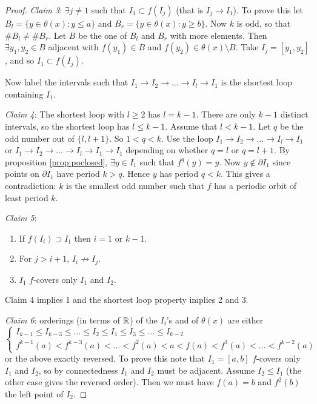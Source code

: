 \documentclass{notes}
\theoremstyle{plain}
\begin{document}
\begin{proof}
\emph{Claim 3}:  $\exists j \neq 1$ such that $I_1 \subset f(I_j)$
(that is $I_j \to I_1$).  To prove this let $B_l = \{y \in \theta(x)
: y \le a \}$ and $B_r = \{y \in \theta(x): y \ge b\}$.  Now $k$ is
odd, so that $\# B_l \neq \# B_r$.  Let $B$ be the one of $B_l$ and $B_r$
with more elements.  Then $\exists y_1, y_2 \in B$ adjacent with 
$f(y_1) \in B$ and $f(y_2) \in \theta(x) \setminus B$.  Take $I_j =
[y_1,y_2]$, and so $I_1 \subset f(I_j)$.

Now label the intervals such that $I_1 \to I_2 \to \dots \to I_l \to I_1$
is the shortest loop containing $I_1$.

\emph{Claim 4}: The shortest loop with $l \ge 2$ has $l=k-1$.  There
are only $k-1$ distinct intervals, so the shortest loop has $l \le
k-1$.  Assume that $l<k-1$.  Let $q$ be
the odd number out of $\{l, l+1\}$.  So $1 < q < k$. Use the loop
$I_1 \to I_2 \to \dots \to I_l \to I_1$ or $I_1 \to I_2 \to \dots \to
I_l \to I_1 \to I_1$ depending on whether $q=l$ or $q=l+1$.  By
proposition \ref{prop:poclosed}, $\exists y \in I_1$ such that $f^q(y)
= y$.  Now $y \notin \partial I_1$ since points on $\partial I_1$ have
period $k > q$. Hence $y$ has period $q < k$.  This gives a
contradiction: $k$ is the smallest odd number such that $f$ has a
periodic orbit of least period $k$.

\emph{Claim 5}:  \begin{enumerate}
\item If $f(I_i) \supset I_1$ then $i = 1$ or $k-1$.
\item For $j > i+1$, $I_i \not \to I_j$.
\item $I_1$ $f$-covers only $I_1$ and $I_2$.
\end{enumerate}
Claim 4 implies 1 and the shortest loop property implies 2 and 3.

\emph{Claim 6}:  orderings (in terms of $\mathbb{R}$) of the $I_i$'s and of
$\theta(x)$ are either
\[
\begin{cases}
I_{k-1} \le I_{k-3} \le \dots \le I_2 \le I_1 \le I_3 \le \dots \le
I_{k-2} \\
f^{k-1}(a) < f^{k-3}(a) < \dots < f^2(a) < a < f(a) < f^3(a) < \dots <
 f^{k-2}(a)
\end{cases}
\]
or the above exactly reversed.  To prove this note that $I_1=[a,b]$
$f$-covers only $I_1$ and $I_2$, so by connectedness $I_1$ and $I_2$
must be adjacent.  Assume $I_2 \le I_1$ (the other case gives the
reversed order).  Then we must have $f(a) = b$ and $f^2(b)$ the left
point of $I_2$.


\end{proof}
\end{document}
